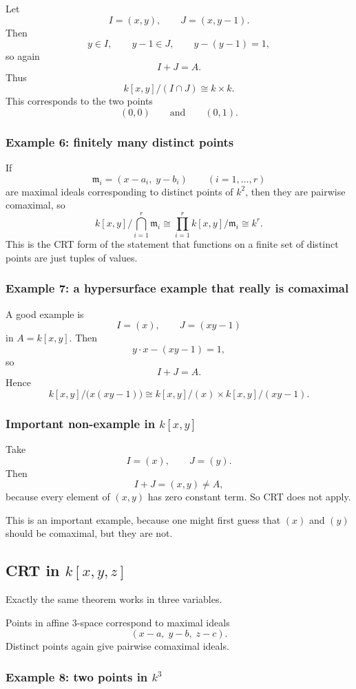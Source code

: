 \documentclass[12pt,a4paper]{article}
\theoremstyle{notespace}
\begin{document}
Let
\[
I=(x,y),\qquad J=(x,y-1).
\]
Then
\[
y\in I,\qquad y-1\in J,\qquad y-(y-1)=1,
\]
so again
\[
I+J=A.
\]
Thus
\[
k[x,y]/(I\cap J)\cong k\times k.
\]
This corresponds to the two points
\[
(0,0)\qquad \text{and}\qquad (0,1).
\]

\subsubsection{Example 6: finitely many distinct points}

If
\[
\mathfrak m_i=(x-a_i,\;y-b_i)
\qquad (i=1,\dots,r)
\]
are maximal ideals corresponding to distinct points of \(k^2\), then they are pairwise comaximal, so
\[
k[x,y]/\bigcap_{i=1}^r \mathfrak m_i
\cong
\prod_{i=1}^r k[x,y]/\mathfrak m_i
\cong
k^r.
\]
This is the CRT form of the statement that functions on a finite set of distinct points are just tuples of values.

\subsubsection{Example 7: a hypersurface example that really is comaximal}

A good example is
\[
I=(x),\qquad J=(xy-1)
\]
in \(A=k[x,y]\).
Then
\[
y\cdot x-(xy-1)=1,
\]
so
\[
I+J=A.
\]
Hence
\[
k[x,y]/\bigl(x(xy-1)\bigr)
\cong
k[x,y]/(x)\times k[x,y]/(xy-1).
\]

\subsubsection{Important non-example in \(k[x,y]\)}

Take
\[
I=(x),\qquad J=(y).
\]
Then
\[
I+J=(x,y)\neq A,
\]
because every element of \((x,y)\) has zero constant term.
So CRT does not apply.

This is an important example, because one might first guess that \((x)\) and \((y)\) should be comaximal, but they are not.

\subsection{CRT in \(k[x,y,z]\)}

Exactly the same theorem works in three variables.

Points in affine \(3\)-space correspond to maximal ideals
\[
(x-a,\;y-b,\;z-c).
\]
Distinct points again give pairwise comaximal ideals.

\subsubsection{Example 8: two points in \(k^3\)}
\end{document}
